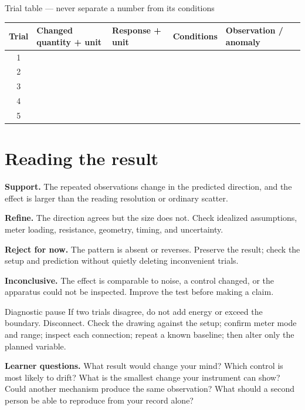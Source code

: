 \begin{teloscard}{Trial table --- never separate a number from its conditions}
\begin{tabularx}{\linewidth}{@{}c p{.17\linewidth}p{.17\linewidth}p{.14\linewidth}L@{}}
\toprule
\textbf{Trial}&\textbf{Changed quantity + unit}&\textbf{Response + unit}&
\textbf{Conditions}&\textbf{Observation / anomaly}\\
&&&&\\[1.3em] 2&&&&\\[1.3em] 3&&&&\\[1.3em] 4&&&&\\[1.3em] 5&&&&\\
\bottomrule
\end{tabularx}
\end{teloscard}

\section{Reading the result}
\begin{multicols}{2}
\textbf{Support.} The repeated observations change in the predicted direction,
and the effect is larger than the reading resolution or ordinary scatter.

\textbf{Refine.} The direction agrees but the size does not. Check idealized
assumptions, meter loading, resistance, geometry, timing, and uncertainty.

\textbf{Reject for now.} The pattern is absent or reverses. Preserve the result;
check the setup and prediction without quietly deleting inconvenient trials.

\textbf{Inconclusive.} The effect is comparable to noise, a control changed, or
the apparatus could not be inspected. Improve the test before making a claim.
\end{multicols}

\newpage
{}
\begin{gate}{Diagnostic pause}
If two trials disagree, do not add energy or exceed the boundary. Disconnect.
Check the drawing against the setup; confirm meter mode and range; inspect each
connection; repeat a known baseline; then alter only the planned variable.
\end{gate}
\begin{predict}
\textbf{Learner questions.} What result would change your mind? Which control is
most likely to drift? What is the smallest change your instrument can show?
Could another mechanism produce the same observation? What should a second
person be able to reproduce from your record alone?
\end{predict}
